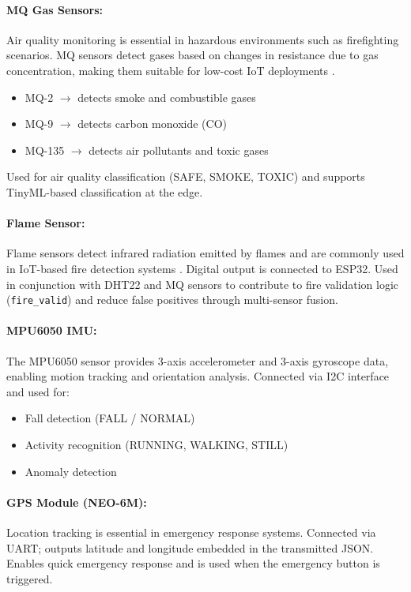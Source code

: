 \documentclass[12pt,a4paper]{article}
\begin{document}
	\paragraph{MQ Gas Sensors:}
	Air quality monitoring is essential in hazardous environments such as firefighting scenarios. MQ sensors detect gases based on changes in resistance due to gas concentration, making them suitable for low-cost IoT deployments \cite{wang2023}.
	\begin{itemize}
		\item MQ-2 $\rightarrow$ detects smoke and combustible gases
		\item MQ-9 $\rightarrow$ detects carbon monoxide (CO)
		\item MQ-135 $\rightarrow$ detects air pollutants and toxic gases
	\end{itemize}
	Used for air quality classification (SAFE, SMOKE, TOXIC) and supports TinyML-based classification at the edge.
	
	\paragraph{Flame Sensor:}
	Flame sensors detect infrared radiation emitted by flames and are commonly used in IoT-based fire detection systems \cite{bolimera2025}. Digital output is connected to ESP32. Used in conjunction with DHT22 and MQ sensors to contribute to fire validation logic (\texttt{fire\_valid}) and reduce false positives through multi-sensor fusion.
	
	\paragraph{MPU6050 IMU:}
	The MPU6050 sensor provides 3-axis accelerometer and 3-axis gyroscope data, enabling motion tracking and orientation analysis. Connected via I2C interface and used for:
	\begin{itemize}
		\item Fall detection (FALL / NORMAL)
		\item Activity recognition (RUNNING, WALKING, STILL)
		\item Anomaly detection
	\end{itemize}
	
	\paragraph{GPS Module (NEO-6M):}
	Location tracking is essential in emergency response systems. Connected via UART; outputs latitude and longitude embedded in the transmitted JSON. Enables quick emergency response and is used when the emergency button is triggered.
	
\end{document}
